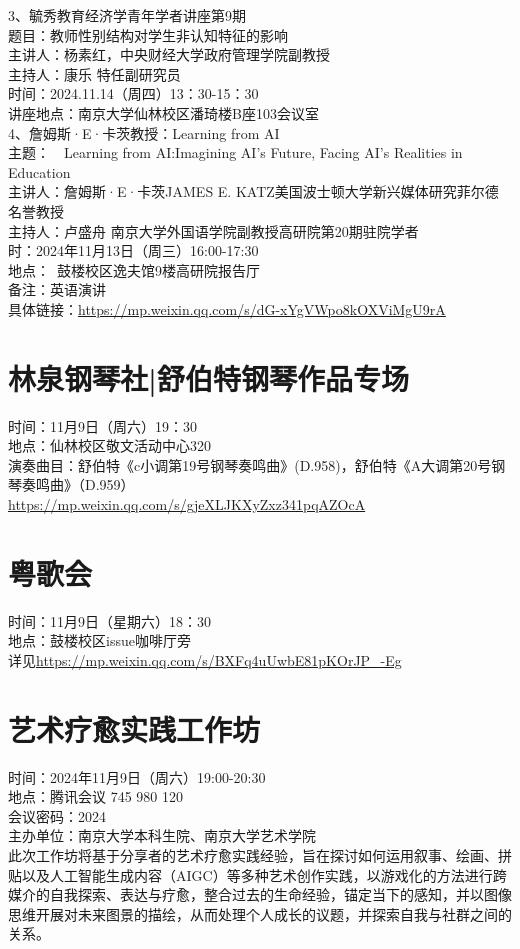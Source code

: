 \documentclass[letterpaper, 12pt]{article}
\begin{document}
\begin{multicols}{2}
3、毓秀教育经济学青年学者讲座第9期\\
题目：教师性别结构对学生非认知特征的影响\\
主讲人：杨素红，中央财经大学政府管理学院副教授\\
主持人：康乐 特任副研究员\\
时间：2024.11.14（周四）13：30-15：30\\
讲座地点：南京大学仙林校区潘琦楼B座103会议室\\

4、詹姆斯·E·卡茨教授：Learning from AI\\
主题：  Learning from AI:Imagining AI’s Future, Facing AI’s Realities in Education\\
主讲人：詹姆斯·E·卡茨JAMES E. KATZ美国波士顿大学新兴媒体研究菲尔德名誉教授\\
主持人：卢盛舟 南京大学外国语学院副教授高研院第20期驻院学者\\
时：2024年11月13日（周三）16:00-17:30\\
地点： 鼓楼校区逸夫馆9楼高研院报告厅\\
备注：英语演讲\\
具体链接：\url{https://mp.weixin.qq.com/s/dG-xYgVWpo8kOXViMgU9rA}\\

\section{林泉钢琴社|舒伯特钢琴作品专场}
时间：11月9日（周六）19：30\\
地点：仙林校区敬文活动中心320\\
演奏曲目：舒伯特《c小调第19号钢琴奏鸣曲》(D.958)，舒伯特《A大调第20号钢琴奏鸣曲》（D.959）\\
\url{https://mp.weixin.qq.com/s/gjeXLJKXyZxz341pqAZOcA}

\section{粤歌会}
时间：11月9日（星期六）18：30\\
地点：鼓楼校区issue咖啡厅旁\\
详见\url{https://mp.weixin.qq.com/s/BXFq4uUwbE81pKOrJP_-Eg}



\section{艺术疗愈实践工作坊}
时间：2024年11月9日（周六）19:00-20:30\\
地点：腾讯会议 745 980 120\\
会议密码：2024\\
主办单位：南京大学本科生院、南京大学艺术学院\\
此次工作坊将基于分享者的艺术疗愈实践经验，旨在探讨如何运用叙事、绘画、拼贴以及人工智能生成内容（AIGC）等多种艺术创作实践，以游戏化的方法进行跨媒介的自我探索、表达与疗愈，整合过去的生命经验，锚定当下的感知，并以图像思维开展对未来图景的描绘，从而处理个人成长的议题，并探索自我与社群之间的关系。

\end{multicols}
\end{document}
